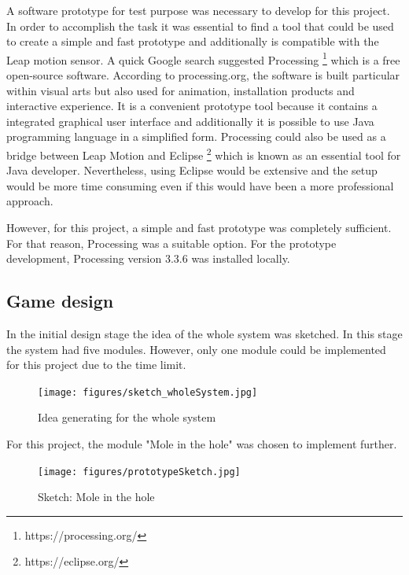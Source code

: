 A software prototype for test purpose was necessary to develop for this project. In order to accomplish the task it was essential to find a tool that could be used to create a simple and fast prototype and additionally is compatible with the Leap motion sensor. A quick Google search suggested Processing \footnote{https://processing.org/} which is a free open-source software. According to processing.org, the software is built particular within visual arts but also used for animation, installation products and interactive experience. It is a convenient prototype tool because it contains a integrated graphical user interface and additionally it is possible to use Java programming language in a simplified form.
Processing could also be used as a bridge between Leap Motion and Eclipse \footnote{https://eclipse.org/} which is known as an essential tool for Java developer.  Nevertheless, using Eclipse would be extensive and the setup would be more time consuming even if this would have been a more professional approach.

However, for this project, a simple and fast prototype was completely sufficient. For that reason, Processing was a suitable option. For the prototype development, Processing version 3.3.6 was installed locally.


\subsection{Game design}

In the initial design stage the idea of the whole system was sketched. In this stage the system had five modules. However, only one module could be implemented for this project due to the time limit.

\begin{figure}[h]  %
  \centering
  \texttt{[image: figures/sketch\_wholeSystem.jpg]}
  \caption[Idea generating.]{ Idea generating for the whole system}
  \label{fig:setup}
\end{figure}

For this project, the module "Mole in the hole" was chosen to implement further.

\begin{figure}[!h]  %
  \centering
  \texttt{[image: figures/prototypeSketch.jpg]}
  \caption[Sketch Mole in the hole.]{Sketch: Mole in the hole}
  \label{fig:setup}
\end{figure}


